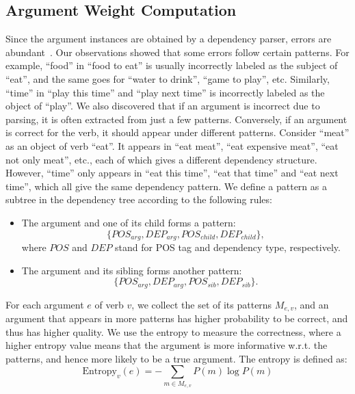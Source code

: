 \subsection{Argument Weight Computation}
\label{sec:qe}
Since the argument instances are obtained by a dependency parser,
errors are abundant~\cite{manning-EtA1}.
Our observations showed that some errors follow certain patterns.
For example, ``food'' in ``food to eat''
is usually incorrectly labeled as the subject of ``eat'',
and the same goes for ``water to drink'', ``game to play'', etc.
Similarly, ``time'' in ``play this time'' and ``play next time''
is incorrectly labeled as the object of ``play''.
We also discovered that if an argument is incorrect due to parsing,
it is often extracted from just a few patterns. Conversely,
if an argument is correct for the verb, it should appear under
different patterns. Consider ``meat'' as an object of verb ``eat''.
It appears in ``eat meat'', ``eat expensive meat'', ``eat not only meat'',
etc., each of which gives a different dependency structure.  However,
``time'' only appears in ``eat this time'', ``eat that time''
and ``eat next time'', which all give the same dependency pattern.
We define a pattern as a subtree in the dependency tree
according to the following rules:
\begin{itemize}
\item The argument and one of its child
forms a pattern:
$$\{POS_{arg}, DEP_{arg}, POS_{child}, DEP_{child}\},$$
where $POS$ and $DEP$ stand for POS tag and dependency type, respectively.
\item The argument and its sibling forms another pattern:
$$\{POS_{arg}, DEP_{arg}, POS_{sib}, DEP_{sib}\}.$$
\end{itemize}

For each argument $e$ of verb $v$, we collect the set of its patterns
$M_{e,v}$, and an argument that appears in more patterns has
higher probability to be correct, and thus has higher quality.
We use the entropy to measure the correctness, where a higher
entropy value means that the argument is more informative w.r.t.
the patterns, and hence more likely to be a true argument.
The entropy is defined as:
\begin{equation}
\text{Entropy}_v(e)=-\sum_{m\in M_{e,v}}{P(m)\log{P(m)}}
\end{equation}

